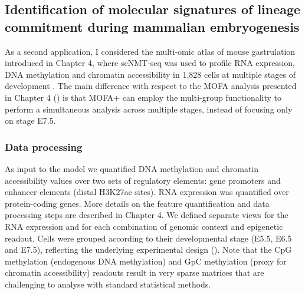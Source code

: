 
\subsection{Identification of molecular signatures of lineage commitment during mammalian embryogenesis}

As a second application, I considered the multi-omic atlas of mouse gastrulation introduced in Chapter 4, where scNMT-seq was used to profile RNA expression, DNA methylation and chromatin accessibility in 1,828 cells at multiple stages of development \cite{Argelaguet2019}. The main difference with respect to the MOFA analysis presented in Chapter 4 () is that MOFA+ can employ the multi-group functionality to perform a simultaneous analysis across multiple stages, instead of focusing only on stage E7.5.

\subsubsection{Data processing}

As input to the model we quantified DNA methylation and chromatin accessibility values over two sets of regulatory elements: gene promoters and enhancer elements (distal H3K27ac sites). RNA expression was quantified over protein-coding genes. More details on the feature quantification and data processing steps are described in Chapter 4. We defined separate views for the RNA expression and for each combination of genomic context and epigenetic readout. Cells were grouped according to their developmental stage (E5.5, E6.5 and E7.5), reflecting the underlying experimental design \cite{Argelaguet2019} (). Note that the CpG methylation (endogenous DNA methylation) and GpC methylation (proxy for chromatin accessibility) readouts result in very sparse matrices that are challenging to analyse with standard statistical methods.

